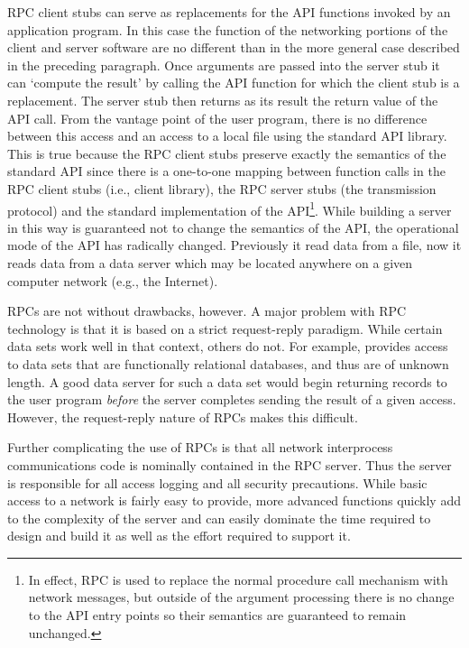 RPC client stubs can serve as replacements for the API functions invoked by
an application program. In this case the function of the networking portions
of the client and server software are no different than in the more general
case described in the preceding paragraph. Once arguments are passed into the
server stub it can `compute the result' by calling the API function for which
the client stub is a replacement. The server stub then returns as its result
the return value of the API call. From the vantage point of the user program,
there is no difference between this access and an access to a local file
using the standard API library.  This is true because the RPC client stubs
preserve exactly the semantics of the standard API since there is a
one-to-one mapping between function calls in the RPC client stubs (i.e.,
client library), the RPC server stubs (the transmission protocol) and the
standard implementation of the API\footnote{In effect, RPC is used to replace
the normal procedure call mechanism with network messages, but outside of the
argument processing there is no change to the API entry points so their
semantics are guaranteed to remain unchanged.}. While building a server in
this way is guaranteed not to change the semantics of the API, the
operational mode of the API has radically changed. Previously it read data
from a file, now it reads data from a data server which may be located
anywhere on a given computer network (e.g., the Internet).

RPCs are not without drawbacks, however. A major problem with RPC technology
is that it is based on a strict request-reply paradigm. While certain
data sets work well in that context, others do not. For example, \jgofs
provides access to data sets that are functionally relational databases, and
thus are of unknown length. A good data server for such a data set would begin
returning records to the user program {\em before\/} the server completes
sending the result of a given access. However, the request-reply nature of
RPCs makes this difficult.

Further complicating the use of RPCs is that all network interprocess
communications code is nominally contained in the RPC server. Thus the server
is responsible for all access logging and all security precautions. While
basic access to a network is fairly easy to provide, more advanced functions
quickly add to the complexity of the server and can easily dominate the time
required to design and build it as well as the effort required to support it. 

